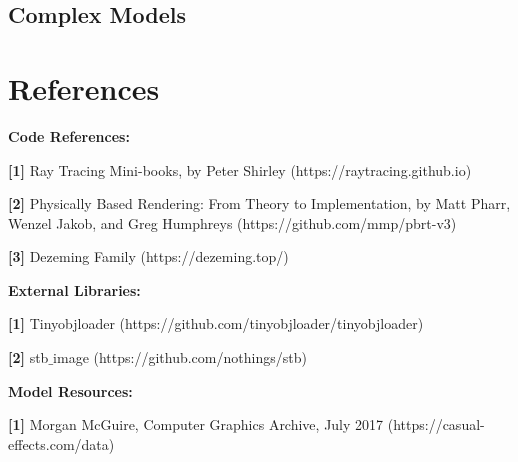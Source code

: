 \documentclass[utf8]{article}
\begin{document}
\subsection{Complex Models}


\section{References}
\noindent
\textbf{Code References: }

\noindent
\textbf{[1]} Ray Tracing Mini-books, by Peter Shirley (https://raytracing.github.io)

\noindent
\textbf{[2]} Physically Based Rendering: From Theory to Implementation, by Matt Pharr, Wenzel Jakob, and Greg Humphreys (https://github.com/mmp/pbrt-v3)

\noindent
\textbf{[3]} Dezeming Family (https://dezeming.top/)

\noindent
\textbf{External Libraries: }

\noindent
\textbf{[1]} Tinyobjloader (https://github.com/tinyobjloader/tinyobjloader)

\noindent
\textbf{[2]} stb$\_$image (https://github.com/nothings/stb)

\noindent
\textbf{Model Resources: }

\noindent
\textbf{[1]} Morgan McGuire, Computer Graphics Archive, July 2017 (https://casual-effects.com/data)
\end{document}
